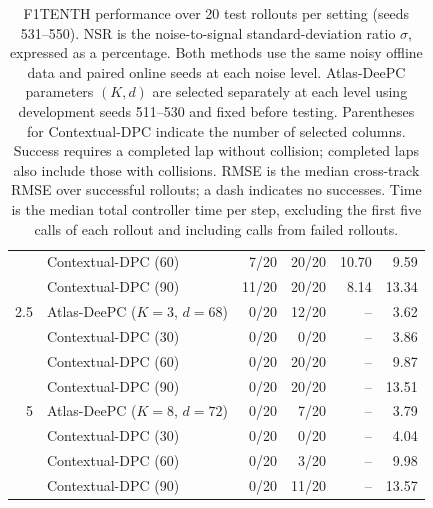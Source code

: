 \begin{table}[t]
\begin{tabular}{@{}rlrrrr@{}}
        & Contextual-DPC (60) & 7/20 & 20/20 & 10.70 & 9.59 \\
        & Contextual-DPC (90) & 11/20 & 20/20 & 8.14 & 13.34 \\
        \midrule
        2.5 & Atlas-DeePC ($K=3$, $d=68$) & 0/20 & 12/20 & -- & 3.62 \\
        & Contextual-DPC (30) & 0/20 & 0/20 & -- & 3.86 \\
        & Contextual-DPC (60) & 0/20 & 20/20 & -- & 9.87 \\
        & Contextual-DPC (90) & 0/20 & 20/20 & -- & 13.51 \\
        \midrule
        5 & Atlas-DeePC ($K=8$, $d=72$) & 0/20 & 7/20 & -- & 3.79 \\
        & Contextual-DPC (30) & 0/20 & 0/20 & -- & 4.04 \\
        & Contextual-DPC (60) & 0/20 & 3/20 & -- & 9.98 \\
        & Contextual-DPC (90) & 0/20 & 11/20 & -- & 13.57 \\
        \bottomrule
    \end{tabular}
    \endgroup
    \caption{F1TENTH performance over 20 test rollouts per setting
    (seeds 531--550). NSR is the noise-to-signal standard-deviation ratio
    $\sigma$, expressed as a percentage. Both methods use the same noisy
    offline data and paired online seeds at each noise level.
    Atlas-DeePC parameters $(K,d)$ are selected separately at each level
    using development seeds 511--530 and fixed before testing.
    Parentheses for Contextual-DPC indicate the number of selected columns.
    Success requires a completed lap without collision; completed laps
    also include those with collisions. RMSE is the median cross-track
    RMSE over successful rollouts; a dash indicates no successes.
    Time is the median total controller time per step, excluding the first
    five calls of each rollout and including calls from failed rollouts.}
    \label{tab:f1tenth-noise-comparison}
\end{table}

